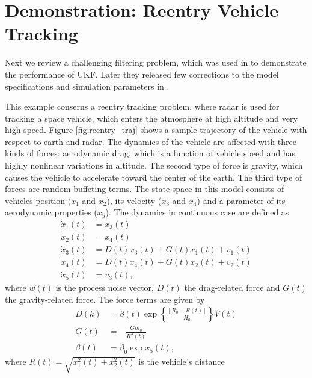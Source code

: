 \clearpage
\section{Demonstration: Reentry Vehicle Tracking}

Next we review a challenging filtering problem, which was used in
\citet{Julier+Uhlmann:2004} to demonstrate the performance of
UKF. Later they released few corrections to the model specifications
and simulation parameters in \citet{Julier+Uhlmann:2004b}.

This example conserns a reentry tracking problem, where radar is used
for tracking a space vehicle, which enters the atmosphere at high
altitude and very high speed. Figure \ref{fig:reentry_traj} shows a
sample trajectory of the vehicle with respect to earth and radar. The
dynamics of the vehicle are affected with three kinds of forces:
aerodynamic drag, which is a function of vehicle speed and has highly
nonlinear variations in altitude. The second type of force is gravity,
which causes the vehicle to accelerate toward the center of the
earth. The third type of forces are random buffeting terms. The state
space in this model consists of vehicles position ($x_1$ and $x_2$),
its velocity ($x_3$ and $x_4$) and a parameter of its aerodynamic
properties ($x_5$).  The dynamics in continuous case are defined as
\citep{Julier+Uhlmann:2004}
%
\begin{equation}
\begin{split}
%
\dot{x}_1(t) & = x_3(t) \\ \dot{x}_2(t) & = x_4(t) \\ \dot{x}_3(t) & =
D(t)x_3(t) + G(t)x_1(t) + v_1(t) \\ \dot{x}_4(t) & = D(t)x_4(t) +
G(t)x_2(t) + v_2(t) \\ \dot{x}_5(t) & = v_3(t),
%
\end{split}
\end{equation}
%
where $\vec{w}(t)$ is the process noise vector, $D(t)$ the
drag-related force and $G(t)$ the gravity-related force.  The force
terms are given by
%
\begin{equation}
\begin{split}
%
D(k) & = \beta(t) \exp \left\{ \frac{[R_0 - R(t)]}{H_0}\right\} V(t)
\\ G(t) & = -\frac{Gm_0}{R^3(t)} \\ \beta (t) & = \beta_0 \exp x_5(t),
%
\end{split}
\end{equation}
%
where $R(t) = \sqrt{x_1^2(t) + x_2^2(t)}$ is the vehicle's distance
